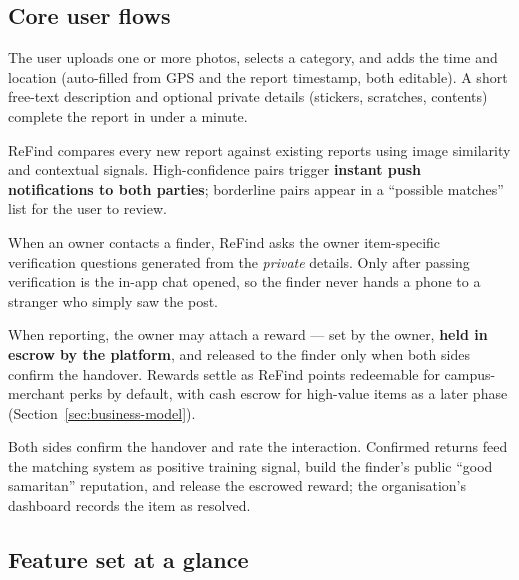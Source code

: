 \documentclass[11pt,a4paper]{article}
\begin{document}
\subsection{Core user flows}

\begin{description}[style=nextline,leftmargin=1.2em]
  \item[Report.] The user uploads one or more photos, selects a category, and adds the time
        and location (auto-filled from GPS and the report timestamp, both editable). A short
        free-text description and optional private details (stickers, scratches, contents)
        complete the report in under a minute.
  \item[Automatic matching.] ReFind compares every new report against existing reports
        using image similarity and contextual signals. High-confidence pairs trigger
        \textbf{instant push notifications to both parties}; borderline pairs appear in a
        ``possible matches'' list for the user to review.
  \item[Verified claim.] When an owner contacts a finder, ReFind asks the owner
        item-specific verification questions generated from the \emph{private} details.
        Only after passing verification is the in-app chat opened, so the finder never
        hands a phone to a stranger who simply saw the post.
  \item[Optional reward.] When reporting, the owner may attach a reward --- set by the
        owner, \textbf{held in escrow by the platform}, and released to the finder only
        when both sides confirm the handover. Rewards settle as ReFind points redeemable
        for campus-merchant perks by default, with cash escrow for high-value items as a
        later phase (Section~\ref{sec:business-model}).
  \item[Return \& feedback.] Both sides confirm the handover and rate the interaction.
        Confirmed returns feed the matching system as positive training signal, build the
        finder's public ``good samaritan'' reputation, and release the escrowed reward;
        the organisation's dashboard records the item as resolved.
\end{description}

\subsection{Feature set at a glance}
\end{document}
